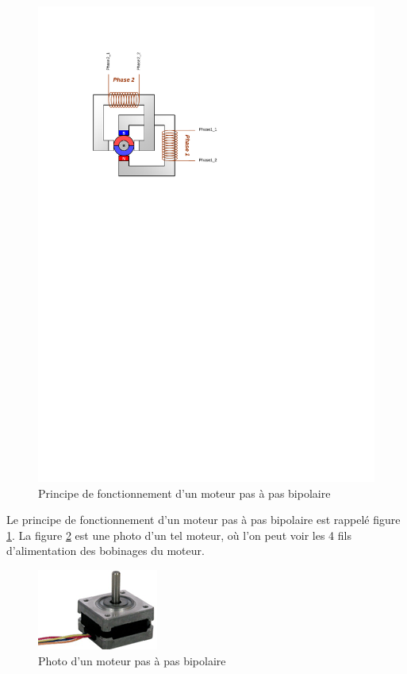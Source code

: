 \documentclass[a4paper]{article}
\begin{document}
\begin{figure}[H]
	\centering
	\includegraphics[scale=1.00]{Images/Moteur_pas_a_pas_bipolaire_principe}
	\caption{Principe de fonctionnement d'un moteur pas à pas bipolaire
		\label{Moteur_pas_a_pas_bipolaire_principe}}
\end{figure}

Le principe de fonctionnement d'un moteur pas à pas bipolaire est rappelé figure \ref{Moteur_pas_a_pas_bipolaire_principe}. La figure \ref{Moteur_pas_a_pas_bipolaire} est une photo d'un tel moteur, où l'on peut voir les 4 fils d'alimentation des bobinages du moteur.

\begin{figure}[H]
	\centering
	\includegraphics[scale=0.75]{Images/Moteur_pas_a_pas_bipolaire.png}
	\caption{Photo d'un moteur pas à pas bipolaire
		\label{Moteur_pas_a_pas_bipolaire}}
\end{figure}
\end{document}
